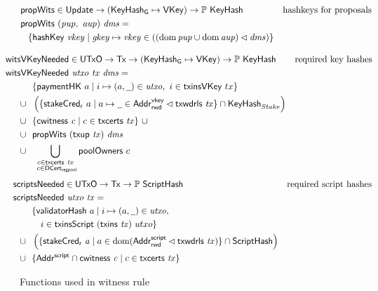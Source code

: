 \begin{figure}[htb]
  \begin{align*}
    & \mathsf{propWits} \in \mathsf{Update} \to (\mathsf{KeyHash_G}\mapsto\mathsf{VKey}) \to \mathbb{P}~\mathsf{KeyHash}
    & \text{hashkeys for proposals} \\
    & \mathsf{propWits}~(\mathit{pup},~\mathit{aup})~\mathit{dms} = \\
    & ~~\left\{
      \mathsf{hashKey}~ \mathit{vkey}
      \mid
      \mathit{gkey}\mapsto\mathit{vkey}\in
      \left(\left(\operatorname{dom}{\mathit{pup}}\cup\operatorname{dom}{\mathit{aup}}\right)\lhd\mathit{dms}\right)
      \right\}
  \end{align*}

    \begin{align*}
    & \hspace{-0.8cm}\fun{witsVKeyNeeded} \in \UTxO \to \Tx \to (\KeyHashGen\mapsto\VKey) \to
      \powerset{\KeyHash}
    & \text{required key hashes} \\
    &  \hspace{-0.8cm}\fun{witsVKeyNeeded}~\var{utxo}~\var{tx}~\var{dms} = \\
    & ~~\{ \fun{paymentHK}~a \mid i \mapsto (a, \wcard) \in \var{utxo},~i\in\fun{txinsVKey}~{tx} \} \\
    \cup & ~~
           \left(\{\fun{stakeCred_r}~a\mid a\mapsto \wcard \in \AddrRWDVKey
      \restrictdom \txwdrls{tx}\} \cap \KeyHash_{Stake}  \right)\\
    \cup & ~~\{\cwitness{c} \mid c \in \txcerts{tx}\}~\cup \\
    \cup & ~~\fun{propWits}~(\fun{txup}~\var{tx})~\var{dms} \\
    \cup & ~~\bigcup_{\substack{c \in \txcerts{tx} \\ ~c \in\DCertRegPool}} \fun{poolOwners}~{c}
  \end{align*}
  \begin{align*}
    & \hspace{-0.5cm}\fun{scriptsNeeded} \in \UTxO \to \Tx \to
      \powerset{\HashScr}
    & \text{required script hashes} \\
    &  \hspace{-0.5cm}\fun{scriptsNeeded}~\var{utxo}~\var{tx} = \\
    & ~~\{ \fun{validatorHash}~a \mid i \mapsto (a, \wcard) \in \var{utxo},\\
    & ~~~~~i\in\fun{txinsScript}~{(\fun{txins~\var{tx}})}~{utxo}\} \\
    \cup & ~~\left(\{ \fun{stakeCred_{r}}~\var{a} \mid a \in \dom (\AddrRWDScr
           \restrictdom \fun{txwdrls}~\var{tx}) \} \cap \HashScr\right) \\
    \cup & ~~\{\AddrScr \cap \fun{cwitness}~\var{c} \mid c \in \fun{txcerts}~\var{tx}\}
  \end{align*}
  \caption{Functions used in witness rule}
  \label{fig:functions-witnesses}
\end{figure}

